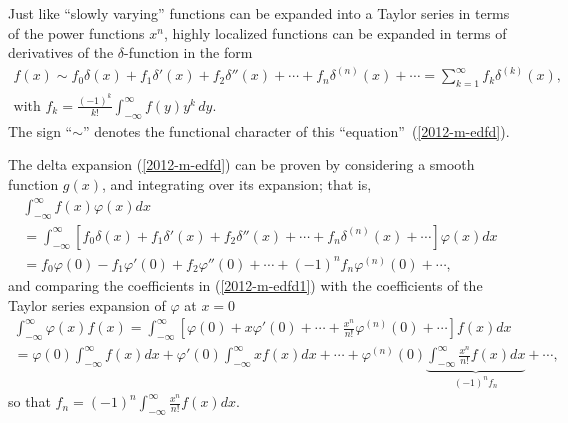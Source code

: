 Just like ``slowly varying'' functions can be expanded into a Taylor series in terms of the power functions $x^n$,
highly localized functions can be expanded in terms of derivatives of the $\delta$-function in the form\cite{lindell:438}
\begin{equation}
\begin{split}
f(x) \sim
f_0 \delta (x) +
f_1 \delta' (x) +
f_2 \delta'' (x) + \cdots +f_n \delta^{(n)}(x) + \cdots =\sum_{k=1}^\infty f_k \delta^{(k)}(x),\\
\textrm{with } f_k= \frac{(-1)^k}{k!} \int_{-\infty}^\infty f(y) y^k \, dy
.
\end{split}
\label{2012-m-edfd}
\end{equation}
The sign ``$\sim$'' denotes the functional character of this ``equation''~(\ref{2012-m-edfd}).

{\color{OliveGreen}
\bproof
The delta expansion (\ref{2012-m-edfd}) can be proven by considering a smooth function $g(x)$, and integrating over its expansion; that is,
\begin{equation}
\begin{split}
 \int_{-\infty}^\infty  f(x) \varphi (x) dx  \\
  =
 \int_{-\infty}^\infty   \left[
f_0 \delta (x) +
f_1 \delta' (x) +
f_2 \delta'' (x)
+ \cdots  +
f_n \delta^{(n)}(x)
+ \cdots \right]\varphi (x)  dx \\
  =
f_0  \varphi (0) - f_1  \varphi' (0) + f_2  \varphi'' (0) +\cdots  + (-1)^n  f_n  \varphi^{(n)}(0)
+ \cdots
,
\end{split}
\label{2012-m-edfd1}
\end{equation}
and comparing the coefficients in (\ref{2012-m-edfd1})
with the coefficients  of  the Taylor series expansion of $\varphi$ at $x=0$
\begin{equation}
\begin{split}
 \int_{-\infty}^\infty  \varphi (x) f(x)  =
 \int_{-\infty}^\infty  \left[
 \varphi (0) +x  \varphi' (0) + \cdots + \frac{x^n}{n!} \varphi^{(n)} (0)  + \cdots
 \right] f(x) dx \\
 =
 \varphi (0) \int_{-\infty}^\infty  f(x) dx  +
\varphi' (0) \int_{-\infty}^\infty x f(x) dx   + \cdots +  \varphi^{(n)} (0)\underbrace{\int_{-\infty}^\infty \frac{x^n}{n!} f(x) dx}_{(-1)^n f_n}  + \cdots
,
\end{split}
\label{2012-m-edfd2tse1}
\end{equation}
so that
$f_n =  (-1)^n  \int_{-\infty}^\infty \frac{x^n}{n!} f(x) dx$.
\eproof
}


